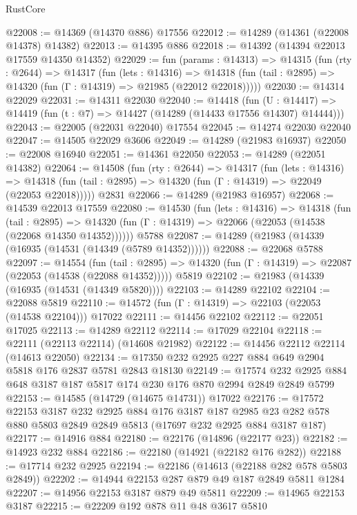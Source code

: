 \begin{lexlean}{RustCore}
\begin{coremodule}
@22008 := @14369 (@14370 @886) @17556
@22012 := @14289 (@14361 (@22008 @14378) @14382)
@22013 := @14395 @886
@22018 := @14392 (@14394 @22013 @17559 @14350 @14352)
@22029 := fun (params : @14313) =>
  @14315
    (fun (rty : @2644) =>
    @14317
      (fun (lets : @14316) =>
      @14318 (fun (tail : @2895) => @14320 (fun (Γ : @14319) => @21985 (@22012 @22018)))))
@22030 := @14314 @22029
@22031 := @14311 @22030
@22040 := @14418
    (fun (U : @14417) => @14419 (fun (t : @7) => @14427 (@14289 (@14433 @17556 @14307) @14444)))
@22043 := @22005 (@22031 @22040) @17554
@22045 := @14274 @22030 @22040
@22047 := @14505 @22029 @3606
@22049 := @14289 (@21983 @16937)
@22050 := @22008 @16940
@22051 := @14361 @22050
@22053 := @14289 (@22051 @14382)
@22064 := @14508
    (fun (rty : @2644) =>
    @14317
      (fun (lets : @14316) =>
      @14318 (fun (tail : @2895) => @14320 (fun (Γ : @14319) => @22049 (@22053 @22018)))))
    @2831
@22066 := @14289 (@21983 @16957)
@22068 := @14539 @22013 @17559
@22080 := @14530
    (fun (lets : @14316) =>
    @14318
      (fun (tail : @2895) =>
      @14320 (fun (Γ : @14319) => @22066 (@22053 (@14538 (@22068 @14350 @14352))))))
    @5788
@22087 := @14289 (@21983 (@14339 (@16935 (@14531 (@14349 (@5789 @14352))))))
@22088 := @22068 @5788
@22097 := @14554
    (fun (tail : @2895) => @14320 (fun (Γ : @14319) => @22087 (@22053 (@14538 (@22088 @14352)))))
    @5819
@22102 := @21983 (@14339 (@16935 (@14531 (@14349 @5820))))
@22103 := @14289 @22102
@22104 := @22088 @5819
@22110 := @14572 (fun (Γ : @14319) => @22103 (@22053 (@14538 @22104))) @17022
@22111 := @14456 @22102
@22112 := @22051 @17025
@22113 := @14289 @22112
@22114 := @17029 @22104
@22118 := @22111 (@22113 @22114) (@14608 @21982)
@22122 := @14456 @22112 @22114 (@14613 @22050)
@22134 := @17350 @232 @2925 @227 @884 @649 @2904 @5818 @176 @2837 @5781 @2843 @18130
@22149 := @17574 @232 @2925 @884 @648 @3187 @187 @5817 @174 @230 @176 @870 @2994 @2849 @2849 @5799
@22153 := @14585 (@14729 (@14675 @14731)) @17022
@22176 := @17572
    @22153
    @3187
    @232
    @2925
    @884
    @176
    @3187
    @187
    @2985
    @23
    @282
    @578
    @880
    @5803
    @2849
    @2849
    @5813
    (@17697 @232 @2925 @884 @3187 @187)
@22177 := @14916 @884
@22180 := @22176 (@14896 (@22177 @23))
@22182 := @14923 @232 @884
@22186 := @22180 (@14921 (@22182 @176 @282))
@22188 := @17714 @232 @2925
@22194 := @22186 (@14613 (@22188 @282 @578 @5803 @2849))
@22202 := @14944 @22153 @287 @879 @49 @187 @2849 @5811 @1284
@22207 := @14956 @22153 @3187 @879 @49 @5811
@22209 := @14965 @22153 @3187
@22215 := @22209 @192 @878 @11 @48 @3617 @5810

\end{coremodule}
\end{lexlean}
